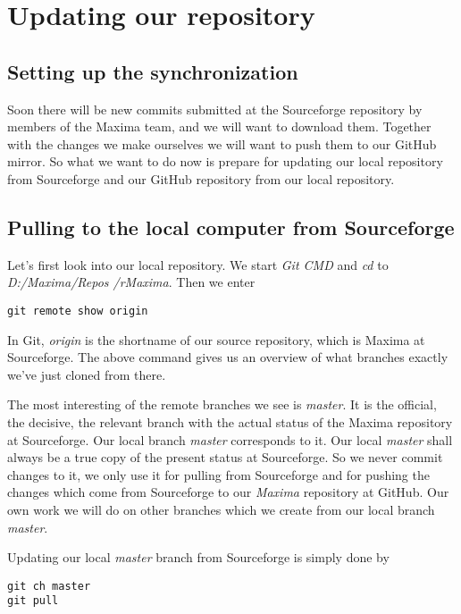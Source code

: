 \documentclass[../Maxima_Workbook.tex]{subfiles}
\begin{document}
\section{Updating our repository}

\subsection{Setting up the synchronization}

Soon there will be new commits submitted at the Sourceforge repository by members of the Maxima team, and we will want to download them. Together with the changes we make ourselves we will want to push them to our GitHub mirror. So what we want to do now is prepare for updating our local repository from Sourceforge and our GitHub repository from our local repository.

\subsection{Pulling to the local computer from Sourceforge}

Let's first look into our local repository. We start \emph{Git CMD} and \emph{cd} to \emph{D:/Maxima/Repos /rMaxima}. Then we enter

\begin{lstlisting}[style=smallblue]
git remote show origin
\end{lstlisting}

In Git, \emph{origin} is the shortname of our source repository, which is Maxima at Sourceforge. The above command gives us an overview of what branches exactly we've just cloned from there. 

\lz The most interesting of the remote branches we see is \emph{master}. It is the official, the decisive, the relevant branch with the actual status of the Maxima repository at Sourceforge. Our local branch \emph{master} corresponds to it. Our local \emph{master} shall always be a true copy of the present status at Sourceforge. So we never commit changes to it, we only use it for pulling from Sourceforge and for pushing the changes which come from Sourceforge to our \emph{Maxima} repository at GitHub. Our own work we will do on other branches which we create from our local branch \emph{master}.

\lz Updating our local \emph{master} branch from Sourceforge is simply done by

\begin{lstlisting}[style=smallblue]
git ch master
git pull
\end{lstlisting}
\end{document}
